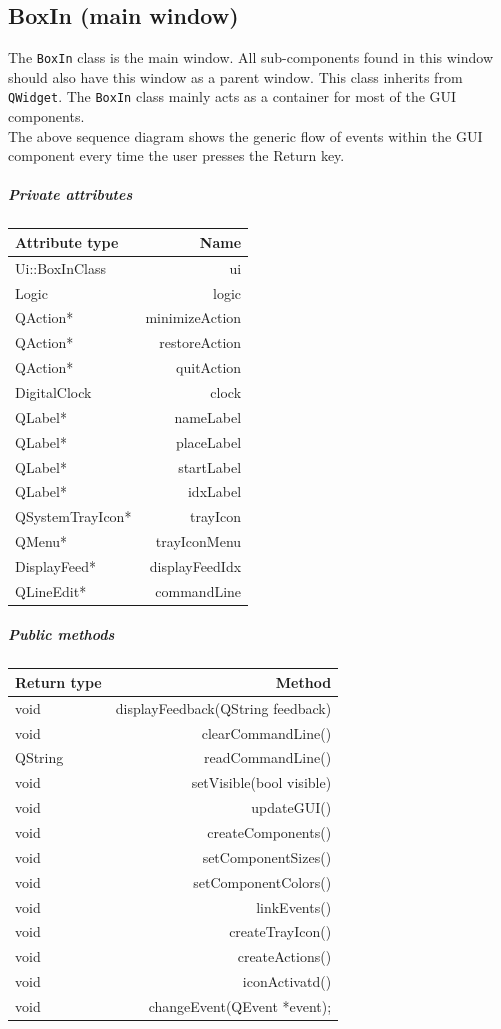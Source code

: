 \documentclass[12pt]{extarticle}
\begin{document}
\subsection{BoxIn (main window)}
The \texttt{BoxIn} class is the main window. All sub-components found in this window should also have this window as a parent window. This class inherits from \texttt{QWidget}. The \texttt{BoxIn} class mainly acts as a container for most of the GUI components.\\
The above sequence diagram shows the generic flow of events within the GUI component every time the user presses the Return key.\\
\subparagraph{Private attributes}
\begin{tabular}{l r}
Attribute type & Name\\
\hline
Ui::BoxInClass & ui\\
Logic & logic\\
QAction* & minimizeAction\\
QAction* & restoreAction\\
QAction* & quitAction\\
DigitalClock & clock\\
QLabel* & nameLabel\\
QLabel* & placeLabel\\
QLabel* & startLabel\\
QLabel* & idxLabel\\
QSystemTrayIcon* & trayIcon\\
QMenu* & trayIconMenu\\
DisplayFeed* & displayFeedIdx\\
QLineEdit* & commandLine\\
\end{tabular}
\subparagraph{Public methods}
\begin{tabular}{l r}
Return type & Method\\
\hline
void & displayFeedback(QString feedback)\\
void & clearCommandLine()\\
QString & readCommandLine()\\
void & setVisible(bool visible)\\
void & updateGUI()\\
void & createComponents()\\
void & setComponentSizes()\\
void & setComponentColors()\\
void & linkEvents()\\
void & createTrayIcon()\\
void & createActions()\\
void & iconActivatd()\\
void & changeEvent(QEvent *event);\\
\end{tabular}\\
\end{document}
